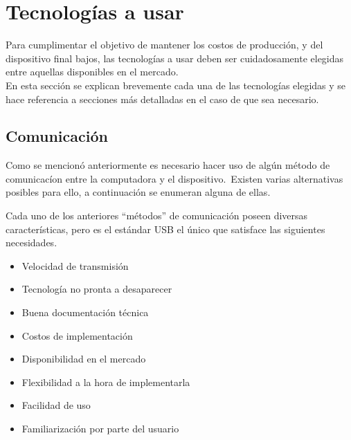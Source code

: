 \chapter{Tecnolog\'ias a usar}

Para cumplimentar el objetivo de mantener los costos de producci\'on, y del
dispositivo final bajos, las tecnolog\'ias a usar deben ser cuidadosamente
elegidas entre aquellas disponibles en el mercado.\\ 

En esta secci\'on se explican brevemente cada una de las tecnolog\'ias
elegidas y se hace referencia a secciones m\'as detalladas en el caso de que
sea necesario.

\section{Comunicaci\'on} %

Como se mencion\'o anteriormente es necesario hacer uso de alg\'un m\'etodo de
comunicac\'ion entre la computadora y el dispositivo.\ Existen varias
alternativas posibles para ello, a continuaci\'on se enumeran alguna de ellas.\


Cada uno de los anteriores ``m\'etodos'' de comunicaci\'on poseen diversas
caracter\'isticas, pero es el est\'andar USB el \'unico que satisface las
siguientes necesidades.

\begin{itemize}
  \item Velocidad de transmisi\'on
  \item Tecnolog\'ia no pronta a desaparecer
  \item Buena documentaci\'on t\'ecnica
  \item Costos de implementaci\'on
  \item Disponibilidad en el mercado
  \item Flexibilidad a la hora de implementarla
  \item Facilidad de uso
  \item Familiarizaci\'on por parte del usuario
\end{itemize}

